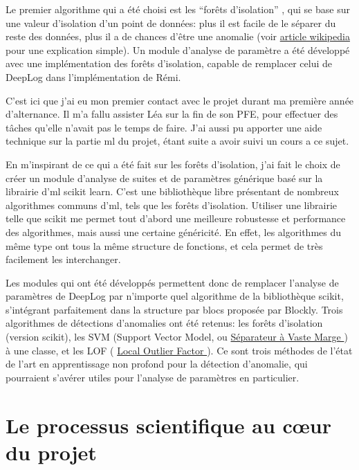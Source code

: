 \documentclass[openany, 12pt]{memoir}
\newcommand\link[2]{
	\href{#1}{#2 {\small\faExternalLink}}
}
\begin{document}
Le premier algorithme qui a été choisi est les ``forêts d'isolation'' \cite{isolationforest}, qui se base sur une valeur d'isolation d'un point de données: plus il est facile de le séparer du reste des données, plus il a de chances d'être une anomalie (voir \link{https://en.wikipedia.org/wiki/Isolation_forest}{article wikipedia} pour une explication simple). Un module d'analyse de paramètre a été développé avec une implémentation des forêts d'isolation, capable de remplacer celui de DeepLog dans l'implémentation de Rémi.

\bigskip
C'est ici que j'ai eu mon premier contact avec le projet durant ma première année d'alternance. Il m'a fallu assister Léa sur la fin de son PFE, pour effectuer des tâches qu'elle n'avait pas le temps de faire. J'ai aussi pu apporter une aide technique sur la partie \gls{ml} du projet, étant suite a avoir suivi un cours a ce sujet.

En m'inspirant de ce qui a été fait sur les forêts d'isolation, j'ai fait le choix de créer un module d'analyse de suites et de paramètres générique basé sur la librairie d'\gls{ml} scikit learn. C'est une bibliothèque libre présentant de nombreux algorithmes communs d'\gls{ml}, tels que les forêts d'isolation. Utiliser une librairie telle que scikit me permet tout d'abord une meilleure robustesse et performance des algorithmes, mais aussi une certaine généricité. En effet, les algorithmes du même type ont tous la même structure de fonctions, et cela permet de très facilement les interchanger.

Les modules qui ont été développés permettent donc de remplacer l'analyse de paramètres de DeepLog par n'importe quel algorithme de la bibliothèque scikit, s'intégrant parfaitement dans la structure par blocs proposée par Blockly. Trois algorithmes de détections d'anomalies ont été retenus: les forêts d'isolation (version scikit), les SVM (Support Vector Model, ou \link{https://fr.wikipedia.org/wiki/Machine_à_vecteurs_de_support}{Séparateur à Vaste Marge}) à une classe, et les LOF (\link{https://en.wikipedia.org/wiki/Local_outlier_factor}{Local Outlier Factor}). Ce sont trois méthodes de l'état de l'art en apprentissage non profond pour la détection d'anomalie, qui pourraient s'avérer utiles pour l'analyse de paramètres en particulier.

\newpage
\chapter{Le processus scientifique au cœur du projet}
\end{document}
